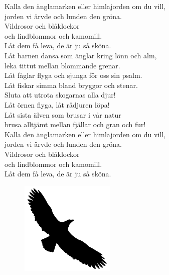 \documentclass[a6paper,10pt]{article}
\begin{document}

\setlength{\oddsidemargin}{-0.47in}
\noindent
\begin{center}
\end{center}
\begin{lyrics}
Kalla den änglamarken eller himlajorden om du vill,\\
jorden vi ärvde och lunden den gröna.\\
Vildrosor och blåklockor \\
och lindblommor och kamomill.\\
Låt dem få leva, de är ju så sköna.
\vspace{5pt}\\
Låt barnen dansa som änglar kring lönn och alm,\\
leka tittut mellan blommande grenar.\\
Låt fåglar flyga och sjunga för oss sin psalm.\\
Låt fiskar simma bland bryggor och stenar.
\vspace{5pt}\\
Sluta att utrota skogarnas alla djur!\\
Låt örnen flyga, låt rådjuren löpa!\\
Låt sista älven som brusar i vår natur\\
brusa alltjämt mellan fjällar och gran och fur!
\vspace{5pt}\\
Kalla den änglamarken eller himlajorden om du vill,\\
jorden vi ärvde och lunden den gröna.\\
Vildrosor och blåklockor \\
och lindblommor och kamomill.\\
Låt dem få leva, de är ju så sköna.
\end{lyrics}
\begin{figure}[!h]
\centering
\includegraphics[width=0.4\textwidth]{eagle.png}
\end{figure}
\end{document}
